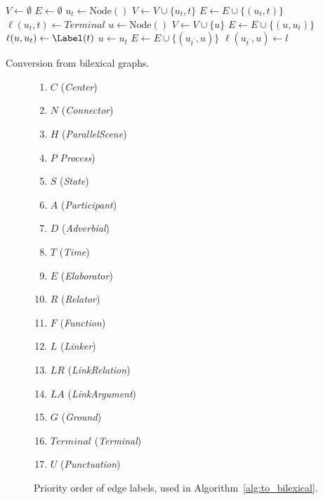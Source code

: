 \documentclass[11pt,a4paper]{article}
\begin{document}
\begin{algorithm}[ht]
 $V \leftarrow \emptyset$\;
 $E \leftarrow \emptyset$\;
  {
  $u_t \leftarrow \mathrm{Node()}$\;
  $V \leftarrow V \cup \{u_t, t\}$\;
  $E \leftarrow E \cup \{(u_t, t)\}$\;
  $\ell(u_t,t)\leftarrow\mathit{Terminal}$\;
   {
    {
     {
     $u \leftarrow \mathrm{Node()}$\;
     $V \leftarrow V \cup \{u\}$\;
     $E \leftarrow E \cup \{(u, u_t)\}$\;
     $\ell(u, u_t) \leftarrow \Label(t)$\;
    } {
     $u \leftarrow u_t$\;
    }
    $E \leftarrow E \cup \{(u_{t^\prime}, u)\}$\;
    $\ell(u_{t^\prime}, u) \leftarrow l$\;
    }
  }
 }
 
  
 \caption{Conversion from bilexical graphs.}
 \label{alg:from_bilexical}
\end{algorithm}

\begin{figure}[ht]
\begin{enumerate}
\itemsep0em
\item $C$ (\textit{Center})
\item $N$ (\textit{Connector})
\item $H$ (\textit{ParallelScene})
\item $P$ \textit{Process})
\item $S$ (\textit{State})
\item $A$ (\textit{Participant})
\item $D$ (\textit{Adverbial})
\item $T$ (\textit{Time})
\item $E$ (\textit{Elaborator})
\item $R$ (\textit{Relator})
\item $F$ (\textit{Function})
\item $L$ (\textit{Linker})
\item $LR$ (\textit{LinkRelation})
\item $LA$ (\textit{LinkArgument})
\item $G$ (\textit{Ground})
\item $\mathit{Terminal}$ (\textit{Terminal})
\item $U$ (\textit{Punctuation})
\end{enumerate}
\caption{Priority order of edge labels, used in Algorithm~\ref{alg:to_bilexical}.}
\label{fig:priority}
\end{figure}
\end{document}
